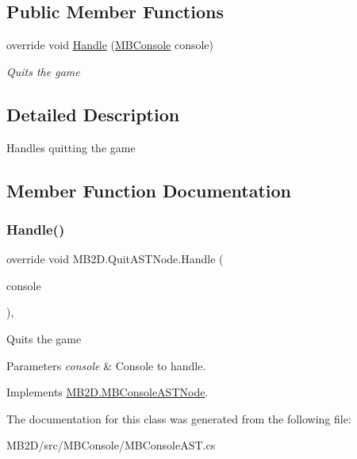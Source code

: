 \subsection*{Public Member Functions}
\begin{DoxyCompactItemize}
\item 
override void \hyperlink{class_m_b2_d_1_1_quit_a_s_t_node_a42a27d409a04151393bedcfff8ca5a3c}{Handle} (\hyperlink{class_m_b2_d_1_1_m_b_console}{M\+B\+Console} console)
\begin{DoxyCompactList}\small\item\em Quits the game \end{DoxyCompactList}\end{DoxyCompactItemize}


\subsection{Detailed Description}
Handles quitting the game 



\subsection{Member Function Documentation}
\hypertarget{class_m_b2_d_1_1_quit_a_s_t_node_a42a27d409a04151393bedcfff8ca5a3c}{}\label{class_m_b2_d_1_1_quit_a_s_t_node_a42a27d409a04151393bedcfff8ca5a3c} 
\subsubsection{\texorpdfstring{Handle()}{Handle()}}
{\footnotesize\ttfamily override void M\+B2\+D.\+Quit\+A\+S\+T\+Node.\+Handle (\begin{DoxyParamCaption}\item[{\hyperlink{class_m_b2_d_1_1_m_b_console}{M\+B\+Console}}]{console }\end{DoxyParamCaption})\hspace{0.3cm}{\ttfamily [inline]}, {\ttfamily [virtual]}}



Quits the game 


\begin{DoxyParams}{Parameters}
{\em console} & Console to handle.\\
\hline
\end{DoxyParams}


Implements \hyperlink{class_m_b2_d_1_1_m_b_console_a_s_t_node_aa70a49e61ab623698af4ed8fda4ebbf5}{M\+B2\+D.\+M\+B\+Console\+A\+S\+T\+Node}.



The documentation for this class was generated from the following file\+:\begin{DoxyCompactItemize}
\item 
M\+B2\+D/src/\+M\+B\+Console/M\+B\+Console\+A\+S\+T.\+cs\end{DoxyCompactItemize}
